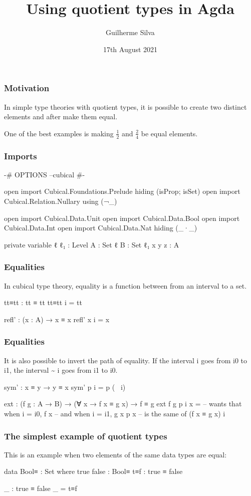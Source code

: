 \documentclass{beamer}
\title{Using quotient types in Agda}
\author{Guilherme Silva}
\institute{Scottish Programming Languages and Verification Summer School}
\date{17th August 2021}
\begin{document}
\frame{\titlepage}

\begin{frame}
  \frametitle{Motivation}
  In simple type theories with quotient types,
  it is possible to create two distinct elements and after
  make them equal.

  One of the best examples is making $ \frac{1}{2} $ and $ \frac{2}{4} $ be equal elements.
\end{frame}

\begin{frame}
  \frametitle{Imports}
  \begin{code}
  {-# OPTIONS --cubical #-}

  open import Cubical.Foundations.Prelude hiding (isProp; isSet)
  open import Cubical.Relation.Nullary using (¬_)

  open import Cubical.Data.Unit
  open import Cubical.Data.Bool
  open import Cubical.Data.Int
  open import Cubical.Data.Nat hiding (_·_)

  private variable
    ℓ ℓ₁ : Level
    A : Set ℓ
    B : Set ℓ₁
    x y z : A
  \end{code}
\end{frame}

\begin{frame}
  \frametitle{Equalities}
  In cubical type theory, equality is a function between from an interval to a set.
  \begin{code}
  tt≡tt : tt ≡ tt
  tt≡tt i = tt

  refl' : (x : A) → x ≡ x
  refl' x i = x
  \end{code}

\end{frame}

\begin{frame}
  \frametitle{Equalities}
  It is also possible to invert the path of equality.
  If the interval i goes from i0 to i1, the interval \~{} i goes from i1 to i0.

  \begin{code}
  sym' : x ≡ y → y ≡ x
  sym' p i = p (~ i)

  ext : (f g : A → B) → (∀ x → f x ≡ g x) → f ≡ g
  ext f g p i x = -- wants that when i = i0, f x
                  --        and when i = i1, g x
                  p x -- is the same of (f x ≡ g x)
                  i
  \end{code}

\end{frame}

\begin{frame}
  \frametitle{The simplest example of quotient types}
  This is an example when two elements of the same data types are equal:
  \begin{code}
  data Bool≡ : Set where
    true false : Bool≡
    t≡f : true ≡ false

  _ : true ≡ false
  _ = t≡f
  \end{code}
\end{frame}
\end{document}

